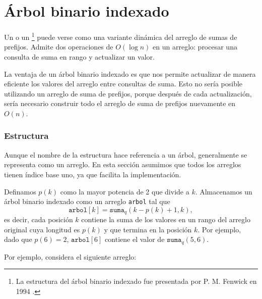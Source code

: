 \section{Árbol binario indexado}


Un  o un \footnote{La
    estructura del árbol binario indexado fue presentada por P. M. Fenwick en 1994 \cite{fen94}.}
puede verse como una variante dinámica del arreglo de sumas de prefijos.
Admite dos operaciones de $O(\log n)$ en un arreglo:
procesar una consulta de suma en rango y actualizar un valor.

La ventaja de un árbol binario indexado es
que nos permite actualizar de manera eficiente
los valores del arreglo entre consultas de suma.
Esto no sería posible utilizando un arreglo de suma de prefijos,
porque después de cada actualización, sería necesario construir todo
el arreglo de suma de prefijos nuevamente en $O(n)$.

\subsubsection{Estructura}

Aunque el nombre de la estructura hace referencia a un árbol,
generalmente se representa como un arreglo.
En esta sección asumimos que todos los arreglos tienen índice base uno,
ya que facilita la implementación.

Definamos $p(k)$ como la mayor potencia de 2 que
divide a $k$.
Almacenamos un árbol binario indexado como un arreglo \texttt{arbol}
tal que
\[ \texttt{arbol}[k] = \texttt{suma}_q(k-p(k)+1,k),\]
es decir, cada posición $k$ contiene la suma de los valores
en un rango del arreglo original cuya longitud es $p(k)$
y que termina en la posición $k$.
Por ejemplo, dado que $p(6)=2$, $\texttt{arbol}[6]$
contiene el valor de $\texttt{suma}_q(5,6)$.

Por ejemplo, considera el siguiente arreglo:
\begin{center}
\end{center}

